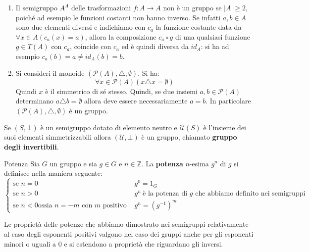 \begin{example}
\begin{enumerate}
	\item Il semigruppo $A^{A}$ delle trasformazioni $f:A \longrightarrow A$ non è un gruppo se $|A|\geq 2$, poiché ad esempio le funzioni costanti non hanno inverso. Se infatti $a,b \in A$ sono due elementi diversi e indichiamo con $c_{a}$ la funzione costante data da $\forall x \in A (c_{a}(x)= a)$, allora la composizione $c_{a} \circ g$ di una qualsiasi funzione $g \in T(A)$ con $c_{a}$, coincide con $c_{a}$ ed è quindi diversa da $id_{A}$: si ha ad esempio $c_{a}(b)= a \neq id_{A}(b)=b$.

	\item Si consideri il monoide $(\mathcal{P}(A), \triangle, \emptyset)$. Si ha:
	\begin{displaymath}
		\forall x \in \mathcal{P}(A) (x \triangle x = \emptyset)
	\end{displaymath}
	Quindi $x$ è il simmetrico di sé stesso. Quindi, se due insiemi $a,b \in \mathcal{P}(A)$ determinano $a \triangle b = \emptyset$ allora deve essere necessariamente $a=b$. In particolare $(\mathcal{P}(A), \triangle, \emptyset)$ è un gruppo.
\end{enumerate}
\end{example}

\begin{osservation}
	Se $(S, \bot)$ è un semigruppo dotato di elemento neutro e $\mathcal{U}(S)$ è l'insieme dei suoi elementi simmetrizzabili  allora $(\mathcal{U}, \bot)$ è un gruppo, chiamato \textbf{gruppo degli invertibili}.
\end{osservation}


\begin{defbox}{Potenza}
	Sia $G$ un gruppo e sia $g \in G$ e $n \in \mathbb{Z}$. La \textbf{potenza} $n$-esima $g^{n}$ di $g$ si definisce nella maniera seguente:
	\begin{equation}
		\begin{cases}
			\mbox{se } n=0 & g^{0} = 1_{G} \\
			\mbox{se } n>0 & g^{n} \ \mbox{è la potenza di $g$ che abbiamo definito nei semigruppi}\\
			\mbox{se } n<0 \mbox{ossia $n=-m$ con $m$ positivo }& g^{n} =(g^{-1})^{m}
		\end{cases}
	\end{equation}
\end{defbox}

Le proprietà delle potenze che abbiamo dimostrato nei semigruppi relativamente al caso degli esponenti positivi valgono nel caso dei gruppi anche per gli esponenti minori o uguali a 0 e si estendono a proprietà che riguardano gli inversi.

